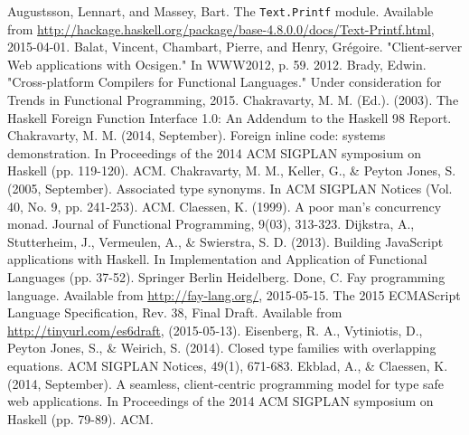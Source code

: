 \documentclass[preprint]{sigplanconf}
\begin{document}

\begin{thebibliography}{}
\softraggedright

  Augustsson, Lennart, and Massey, Bart. The {\tt Text.Printf} module.
  Available from \url{http://hackage.haskell.org/package/base-4.8.0.0/docs/Text-Printf.html},
  2015-04-01.
  Balat, Vincent, Chambart, Pierre, and Henry, Grégoire.
  "Client-server Web applications with Ocsigen." In WWW2012, p. 59. 2012.
  Brady, Edwin.
  "Cross-platform Compilers for Functional Languages."
  Under consideration for Trends in Functional Programming, 2015.
  Chakravarty, M. M. (Ed.). (2003).
  The Haskell Foreign Function Interface 1.0: An Addendum to the Haskell 98
  Report.
  Chakravarty, M. M. (2014, September).
  Foreign inline code: systems demonstration.
  In Proceedings of the 2014 ACM SIGPLAN symposium on Haskell (pp. 119-120).
  ACM.
  Chakravarty, M. M., Keller, G., \& Peyton Jones, S. (2005, September).
  Associated type synonyms.
  In ACM SIGPLAN Notices (Vol. 40, No. 9, pp. 241-253). ACM.
  Claessen, K. (1999).
  A poor man's concurrency monad.
  Journal of Functional Programming, 9(03), 313-323.
  Dijkstra, A., Stutterheim, J., Vermeulen, A., \& Swierstra, S. D. (2013).
  Building JavaScript applications with Haskell.
  In Implementation and Application of Functional Languages (pp. 37-52).
  Springer Berlin Heidelberg.
  Done, C.
  Fay programming language.
  Available from \url{http://fay-lang.org/}, 2015-05-15.
  The 2015 ECMAScript Language Specification, Rev. 38, Final Draft.
  Available from \url{http://tinyurl.com/es6draft},
  (2015-05-13).
  Eisenberg, R. A., Vytiniotis, D., Peyton Jones, S., \& Weirich, S. (2014).
  Closed type families with overlapping equations.
  ACM SIGPLAN Notices, 49(1), 671-683.
  Ekblad, A., \& Claessen, K. (2014, September).
  A seamless, client-centric programming model for type safe web applications.
  In Proceedings of the 2014 ACM SIGPLAN symposium on Haskell (pp. 79-89). ACM.

\end{thebibliography}
\end{document}
